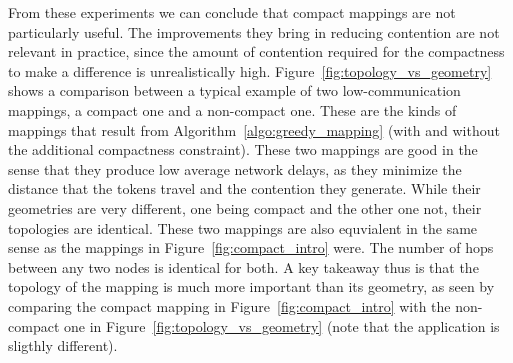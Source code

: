 From these experiments we can conclude that compact mappings are not particularly useful. 
The improvements they bring in reducing contention are not relevant in practice, since the amount of contention required for the compactness to make a difference is unrealistically high.
Figure~\ref{fig:topology_vs_geometry} shows a comparison between a typical example of two low-communication mappings, a compact one and a non-compact one. 
These are the kinds of mappings that result from Algorithm~\ref{algo:greedy_mapping} (with and without the additional compactness constraint).
These two mappings are good in the sense that they produce low average network delays, as they minimize the distance that the tokens travel and the contention they generate.
While their geometries are very different, one being compact and the other one not, their topologies are identical. These two mappings are also equvialent in the same sense as the mappings in Figure~\ref{fig:compact_intro} were.
The number of hops between any two nodes is identical for both.
A key takeaway thus is that the topology of the mapping is much more important than its geometry, as seen by comparing the compact mapping in Figure~\ref{fig:compact_intro} with the non-compact one in Figure~\ref{fig:topology_vs_geometry} (note that the application is sligthly different).
